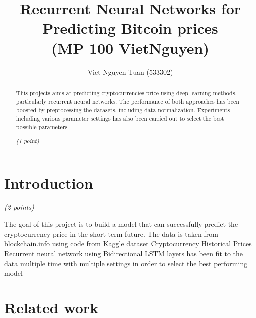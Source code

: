 \documentclass[a4paper,11pt]{article}
\begin{document}
\title{Recurrent Neural Networks for Predicting Bitcoin prices\\
\normalsize (MP 100 VietNguyen)}

\author{Viet Nguyen Tuan (533302)}

\maketitle

\newcommand{\points}[1]{\par\noindent\textit{(#1 points)}}
\newcommand{\onepoint}{\par\noindent\textit{(1 point)}}



\begin{abstract}
 
  This projects aims at predicting cryptocurrencies price using deep learning methods, particularly recurrent neural networks. The performance of both approaches has been boosted by
  preprocessing the datasets, including data normalization. Experiments including various parameter settings has also been carried out to select the best possible parameters
  \onepoint
\end{abstract}

\section{Introduction}


\points{2}



The goal of this project is to build a model that can successfully predict the cryptocurrency price in the short-term future. The data is taken from blockchain.info using code from Kaggle dataset  \href{https://www.kaggle.com/sudalairajkumar/cryptocurrencypricehistory/data}{Cryptocurrency Historical Prices}
Recurrent neural network using Bidirectional LSTM layers has been fit to the data multiple time with multiple settings in order to select the best performing model



\section{Related work}

\end{document}

